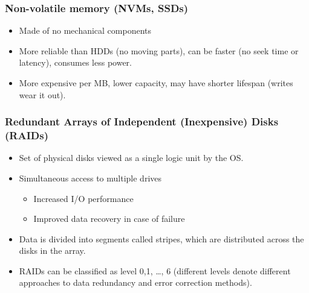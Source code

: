\documentclass[11pt]{article}
\begin{document}
\subsubsection{Non-volatile memory (NVMs, SSDs)}
\label{sec:orgc85df7e}
\begin{itemize}
\item Made of no mechanical components
\item More reliable than HDDs (no moving parts), can be faster (no seek time or latency), consumes less power.
\item More expensive per MB, lower capacity, may have shorter lifespan (writes wear it out).
\end{itemize}

\subsubsection{Redundant Arrays of Independent (Inexpensive) Disks (RAIDs)}
\label{sec:orga6a8005}
\begin{itemize}
\item Set of physical disks viewed as a single logic unit by the OS.
\item Simultaneous access to multiple drives
\begin{itemize}
\item Increased I/O performance
\item Improved data recovery in case of failure
\end{itemize}
\item Data is divided into segments called stripes, which are distributed across the disks in the array.
\item RAIDs can be classified as level 0,1, \ldots , 6 (different levels denote different approaches to data redundancy and error correction methods).
\end{itemize}
\end{document}
